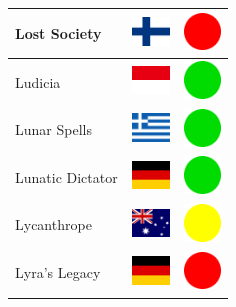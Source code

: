 \documentclass[12pt, a4paper, twoside]{report}
\begin{document}
\begin{center}
\begin{longtable}{|p{5cm}|p{2cm}|p{2cm}|}
 Lost Society                                               & \includegraphics[width=1cm]{../4x3/fi} &   \includegraphics[width=1cm]{../likes/n} \\ \hline
 Ludicia                                                    & \includegraphics[width=1cm]{../4x3/id} &   \includegraphics[width=1cm]{../likes/y} \\ \hline
 Lunar Spells                                               & \includegraphics[width=1cm]{../4x3/gr} &   \includegraphics[width=1cm]{../likes/y} \\ \hline
 Lunatic Dictator                                           & \includegraphics[width=1cm]{../4x3/de} &   \includegraphics[width=1cm]{../likes/y} \\ \hline
 Lycanthrope                                                & \includegraphics[width=1cm]{../4x3/au} &   \includegraphics[width=1cm]{../likes/m} \\ \hline
 Lyra's Legacy                                              & \includegraphics[width=1cm]{../4x3/de} &   \includegraphics[width=1cm]{../likes/n} \\ \hline

\end{longtable}
\end{center}
\end{document}
